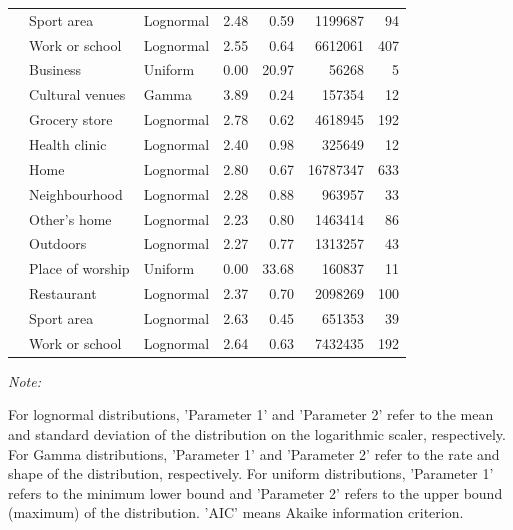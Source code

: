 \documentclass[preprint, 3p,
authoryear]{elsarticle} %
\begin{document}
\begin{table}
{\begin{threeparttable}
\begin{tabular}[t]{rllrrrr}
 & Sport area & Lognormal & 2.48 & 0.59 & 1199687 & 94\\

\multirow[t]{-12}{*}{\raggedleft\arraybackslash 2015} & Work or school & Lognormal & 2.55 & 0.64 & 6612061 & 407\\
\cmidrule{1-7}
 & Business & Uniform & 0.00 & 20.97 & 56268 & 5\\

 & Cultural venues & Gamma & 3.89 & 0.24 & 157354 & 12\\

 & Grocery store & Lognormal & 2.78 & 0.62 & 4618945 & 192\\

 & Health clinic & Lognormal & 2.40 & 0.98 & 325649 & 12\\

 & Home & Lognormal & 2.80 & 0.67 & 16787347 & 633\\

 & Neighbourhood & Lognormal & 2.28 & 0.88 & 963957 & 33\\

 & Other's home & Lognormal & 2.23 & 0.80 & 1463414 & 86\\

 & Outdoors & Lognormal & 2.27 & 0.77 & 1313257 & 43\\

 & Place of worship & Uniform & 0.00 & 33.68 & 160837 & 11\\

 & Restaurant & Lognormal & 2.37 & 0.70 & 2098269 & 100\\

 & Sport area & Lognormal & 2.63 & 0.45 & 651353 & 39\\

\multirow[t]{-12}{*}{\raggedleft\arraybackslash 2022} & Work or school & Lognormal & 2.64 & 0.63 & 7432435 & 192\\
\bottomrule
\end{tabular}
\begin{tablenotes}
\item \textit{Note: } 
\item For lognormal distributions, 'Parameter 1' and 'Parameter 2' refer to the mean and standard deviation of the distribution on the logarithmic scaler, respectively. For Gamma distributions, 'Parameter 1' and 'Parameter 2' refer to the rate and shape of the distribution, respectively. For uniform distributions,  'Parameter 1' refers to the minimum lower bound and 'Parameter 2'  refers to the upper bound (maximum) of the distribution.  'AIC' means Akaike information criterion.
\end{tablenotes}
\end{threeparttable}}
\end{table}
\end{document}
